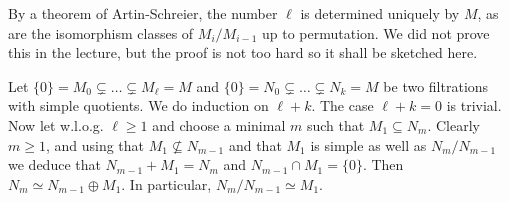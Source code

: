 \documentclass[a4paper,parskip=half,numbers=enddot, DIV=12]{scrreprt}
\begin{document}
\begin{rem}
    \begin{alphanumerate}
    \item {}
        By a theorem of Artin-Schreier, the number $\ell$ is determined uniquely by $M$, as are the isomorphism classes of $M_i/M_{i-1}$ up to permutation. We did not prove this in the lecture, but the proof is not too hard so it shall be sketched here.
        
        Let $\{0\}=M_0\subsetneq \ldots\subsetneq M_\ell=M$ and $\{0\}=N_0\subsetneq\ldots\subsetneq N_k=M$ be two filtrations with simple quotients. We do induction on $\ell+k$. The case $\ell+k=0$ is trivial. Now let w.l.o.g. $\ell\geq1$ and choose  a minimal $m$ such that $M_1\subseteq N_m$. Clearly $m\geq 1$, and using that $M_1\not\subseteq N_{m-1}$ and that $M_1$ is simple as well as $N_m/N_{m-1}$ we deduce that $N_{m-1}+M_1=N_m$ and $N_{m-1}\cap M_1=\{0\}$. Then $N_m\simeq N_{m-1}\oplus M_1$. In particular, $N_m/N_{m-1}\simeq M_1$.
        

\end{alphanumerate}
\end{rem}
\end{document}
